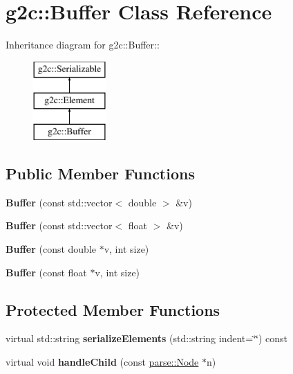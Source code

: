 \hypertarget{classg2c_1_1_buffer}{
\section{g2c::Buffer Class Reference}
\label{classg2c_1_1_buffer}
}
Inheritance diagram for g2c::Buffer::\begin{figure}[H]
\begin{center}
\leavevmode
\includegraphics[height=3cm]{classg2c_1_1_buffer}
\end{center}
\end{figure}
\subsection*{Public Member Functions}
\begin{DoxyCompactItemize}
\item 
\hypertarget{classg2c_1_1_buffer_a768ab0f9efb6aeadad5ccf6a9433a3b4}{
{\bfseries Buffer} (const std::vector$<$ double $>$ \&v)}
\label{classg2c_1_1_buffer_a768ab0f9efb6aeadad5ccf6a9433a3b4}

\item 
\hypertarget{classg2c_1_1_buffer_a13f84ebc9ac0aa17b17d607aeb501b65}{
{\bfseries Buffer} (const std::vector$<$ float $>$ \&v)}
\label{classg2c_1_1_buffer_a13f84ebc9ac0aa17b17d607aeb501b65}

\item 
\hypertarget{classg2c_1_1_buffer_a0a56316bb76f1f208aec78ddbbca2e0e}{
{\bfseries Buffer} (const double $\ast$v, int size)}
\label{classg2c_1_1_buffer_a0a56316bb76f1f208aec78ddbbca2e0e}

\item 
\hypertarget{classg2c_1_1_buffer_a869186238b16b1fb3193a743808356bf}{
{\bfseries Buffer} (const float $\ast$v, int size)}
\label{classg2c_1_1_buffer_a869186238b16b1fb3193a743808356bf}

\end{DoxyCompactItemize}
\subsection*{Protected Member Functions}
\begin{DoxyCompactItemize}
\item 
\hypertarget{classg2c_1_1_buffer_ab8b7cf4a9712e88cba9b68408227720c}{
virtual std::string {\bfseries serializeElements} (std::string indent=\char`\"{}\char`\"{}) const }
\label{classg2c_1_1_buffer_ab8b7cf4a9712e88cba9b68408227720c}

\item 
\hypertarget{classg2c_1_1_buffer_a6452ddc818b9c692dbc817b5a2d6adac}{
virtual void {\bfseries handleChild} (const \hyperlink{classparse_1_1_node}{parse::Node} $\ast$n)}
\label{classg2c_1_1_buffer_a6452ddc818b9c692dbc817b5a2d6adac}

\end{DoxyCompactItemize}
